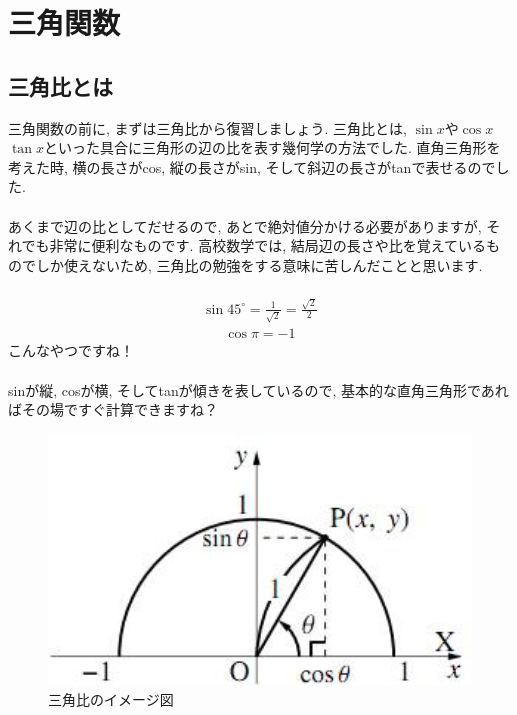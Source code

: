 \documentclass[11pt,a4paper]{jreport}
\begin{document}
\section{三角関数 \label{trigonometry}}
\subsection{三角比とは}
三角関数の前に, まずは三角比から復習しましょう. 三角比とは, $\sin x$や$\cos x$ $\tan x$といった具合に三角形の辺の比を表す幾何学の方法でした. 直角三角形を考えた時, 横の長さがcos, 縦の長さがsin, そして斜辺の長さがtanで表せるのでした. \\
\\
あくまで辺の比としてだせるので, あとで絶対値分かける必要がありますが, それでも非常に便利なものです. 高校数学では, 結局辺の長さや比を覚えているものでしか使えないため, 三角比の勉強をする意味に苦しんだことと思います.\\
\\
\begin{eqnarray}
\sin 45^\circ = \frac{1}{\sqrt{2}} = \frac{\sqrt{2}}2
\end{eqnarray}
\begin{eqnarray}
\cos \pi = -1
\end{eqnarray}
こんなやつですね！\\
\\
sinが縦, cosが横, そしてtanが傾きを表しているので, 基本的な直角三角形であればその場ですぐ計算できますね？\\

\begin{figure}[H]
\label{im:trigonometry}
  \centering
  \includegraphics[width=120mm,bb=0 0 287 170]{figures/trigonometry.png}
  \caption{三角比のイメージ図}
\end{figure}
\end{document}
